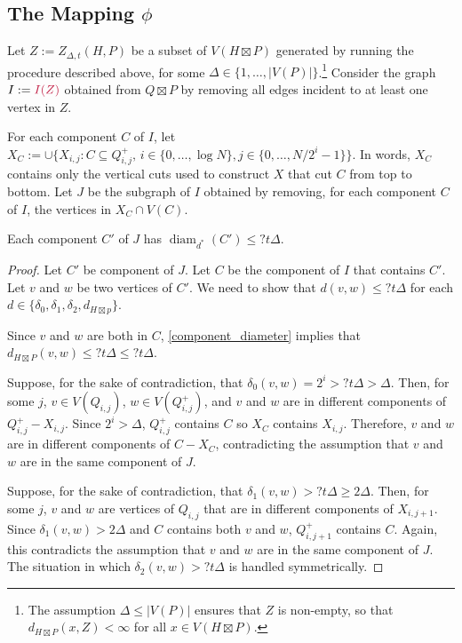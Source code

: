 \documentclass{patmorin}
\makeatletter
\renewcommand{\ge}{\geqslant}
\renewcommand{\le}{\leqslant}
\def\mathcolor#1#{\@mathcolor{#1}}
\def\@mathcolor#1#2#3{%
  \protect\leavevmode
  \begingroup
    \color#1{#2}#3%
  \endgroup
}
\newcommand{\mathdefin}[1]{\mathcolor{brightmaroon}{#1}}
\DeclareMathOperator{\diam}{diam}
\makeatother
\begin{document}
%
%

\subsection{\boldmath The Mapping $\phi$}

Let $Z:=Z_{\Delta,t}(H,P)$ be a subset of $V(H\boxtimes P)$ generated by running the procedure described above, for some $\Delta\in\{1,\ldots,|V(P)|\}$.\footnote{The assumption $\Delta\le |V(P)|$ ensures that $Z$ is non-empty, so that $d_{H\boxtimes P}(x,Z)<\infty$ for all $x\in V(H\boxtimes P)$.}  Consider the graph $I:=\mathdefin{I(Z)}$ obtained from $Q\boxtimes P$ by removing all edges incident to at least one vertex in $Z$.

For each component $C$ of $I$, let $X_C:=\cup\{X_{i,j}:C\subseteq Q^+_{i,j},\, i\in\{0,\ldots,\log N\}, j\in\{0,\ldots,N/2^i-1\}\}$.  In words, $X_C$ contains only the vertical cuts used to construct $X$ that cut $C$ from top to bottom. Let $J$ be the subgraph of $I$ obtained by removing, for each component $C$ of $I$, the vertices in $X_C\cap V(C)$.

\begin{lem}\label{dstar_component_diameter}
  Each component $C'$ of $J$ has $\diam_{d^*}(C')\le ?t\Delta$.
\end{lem}

\begin{proof}
  Let $C'$ be component of $J$. Let $C$ be the component of $I$ that contains $C'$. Let $v$ and $w$ be two vertices of $C'$. We need to show that $d(v,w)\le ?t\Delta$ for each $d\in\{\delta_0, \delta_1,\delta_2,d_{H\boxtimes p}\}$.

  Since $v$ and $w$ are both in $C$, \cref{component_diameter} implies that $d_{H\boxtimes P}(v,w)\le ?t\Delta \le ?t\Delta$.

  Suppose, for the sake of contradiction, that $\delta_0(v,w)=2^i> ?t\Delta> \Delta$. Then, for some $j$, $v\in V(Q_{i,j})$,  $w\in V(Q^+_{i,j})$, and $v$ and $w$ are in different components of $Q^+_{i,j}-X_{i,j}$.  Since $2^i>\Delta$, $Q^+_{i,j}$ contains $C$ so $X_C$ contains $X_{i,j}$. Therefore, $v$ and $w$ are in different components of $C-X_C$, contradicting the assumption that $v$ and $w$ are in the same component of $J$.

  Suppose, for the sake of contradiction, that $\delta_1(v,w)>?t\Delta \ge 2\Delta$.  Then, for some $j$, $v$ and $w$ are vertices of $Q_{i,j}$ that are in different components of $X_{i,j+1}$. Since $\delta_1(v,w)>2\Delta$ and $C$ contains both $v$ and $w$, $Q^+_{i,j+1}$ contains $C$. Again, this contradicts the assumption that $v$ and $w$ are in the same component of $J$.  The situation in which $\delta_2(v,w)>?t\Delta$ is handled symmetrically.
\end{proof}
\end{document}
